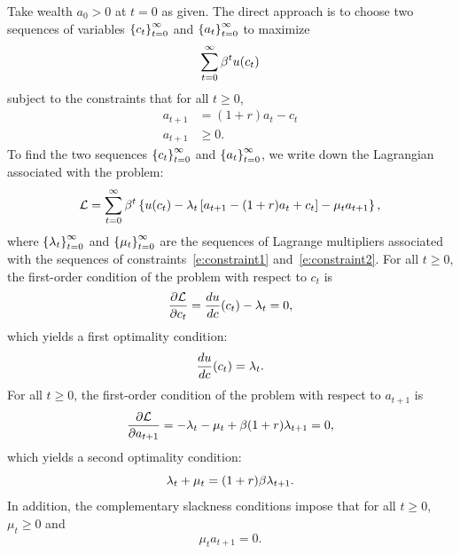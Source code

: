 \documentclass[letterpaper, 11pt, leqno]{article}
\begin{document}
Take wealth $a_0>0$ at $t=0$ as given. The direct approach is to choose two sequences of variables $\left\lbrace c_t \right\rbrace_{t=0}^{\infty}$ and $\left\lbrace a_t \right\rbrace_{t=0}^{\infty}$ to maximize
\begin{equation*}
\sum_{t=0}^{\infty}\beta^t u(c_t)
\end{equation*}
subject to the constraints that for all $t\ge 0$,
\begin{align}
a_{t+1}&=(1+r) a_{t}-c_{t}\label{e:constraint1}\\
a_{t+1}&\ge 0.\label{e:constraint2}
\end{align}
To find the two sequences $\left\lbrace c_t \right\rbrace_{t=0}^{\infty}$ and $\left\lbrace a_t \right\rbrace_{t=0}^{\infty}$, we write down the Lagrangian associated with the problem:
\begin{equation*}
\mathcal{L}=\sum_{t=0}^{\infty}\beta^t \left\lbrace u(c_t)-\lambda_{t} \left[ a_{t+1}-(1+r) a_{t}+c_{t} \right]-\mu_{t} a_{t+1} \right\rbrace,
\end{equation*}
where $\left\lbrace \lambda_t \right\rbrace_{t=0}^{\infty}$ and $\left\lbrace \mu_t \right\rbrace_{t=0}^{\infty}$ are the sequences of Lagrange multipliers associated with the sequences of constraints~\eqref{e:constraint1} and~\eqref{e:constraint2}. For all $t\ge 0$, the first-order condition of the problem with respect to $c_{t}$ is
\begin{equation*}
\pd{\Lc}{c_{t}} = \od{u}{c}(c_{t})- \l_{t}=0,
\end{equation*}
which yields a first optimality condition:
\begin{equation*}
\od{u}{c}(c_{t})=\l_{t}.
\end{equation*}
For all $t\ge 0$, the first-order condition of the problem with respect to $a_{t+1}$ is
\begin{equation*}
\pd{\Lc}{a_{t+1}} = -\l_{t}-\mu_{t}+ \b (1+r) \l_{t+1} =0,
\end{equation*}
which yields a second optimality condition:
\begin{equation*}
\lambda_{t}+\mu_{t}=(1+r) \beta \lambda_{t+1}.
\end{equation*}
In addition, the complementary slackness conditions impose that for all $t\ge 0$, $\mu_{t}\ge 0$ and
\begin{equation*}
\mu_{t} a_{t+1}=0.
\end{equation*}
\end{document}
